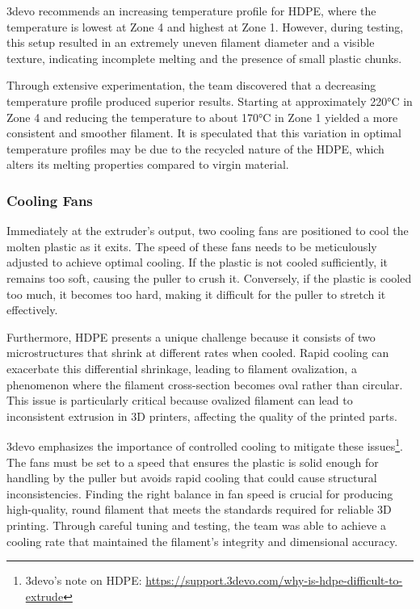 3devo recommends an increasing temperature profile for HDPE, where the temperature is lowest at 
Zone 4 and highest at Zone 1. However, during testing, this setup resulted in an extremely uneven 
filament diameter and a visible texture, indicating incomplete melting and the presence of small 
plastic chunks.

Through extensive experimentation, the team discovered that a decreasing temperature profile 
produced superior results. Starting at approximately 220°C in Zone 4 and reducing the temperature 
to about 170°C in Zone 1 yielded a more consistent and smoother filament. It is speculated that 
this variation in optimal temperature profiles may be due to the recycled nature of the HDPE, 
which alters its melting properties compared to virgin material.

\subsubsection*{Cooling Fans}
Immediately at the extruder's output, two cooling fans are positioned to cool the molten plastic 
as it exits. The speed of these fans needs to be meticulously adjusted to achieve optimal cooling. 
If the plastic is not cooled sufficiently, it remains too soft, causing the puller to crush it. 
Conversely, if the plastic is cooled too much, it becomes too hard, making it difficult for the 
puller to stretch it effectively.

Furthermore, HDPE presents a unique challenge because it consists of two microstructures that 
shrink at different rates when cooled. Rapid cooling can exacerbate this differential shrinkage, 
leading to filament ovalization, a phenomenon where the filament cross-section becomes oval rather 
than circular. This issue is particularly critical because ovalized filament can lead to 
inconsistent extrusion in 3D printers, affecting the quality of the printed parts.

3devo emphasizes the importance of controlled cooling to mitigate these issues\footnote{3devo's 
note on HDPE: \url{https://support.3devo.com/why-is-hdpe-difficult-to-extrude}}. The fans must be 
set to a speed that ensures the plastic is solid enough for handling by the puller but avoids 
rapid cooling that could cause structural inconsistencies. Finding the right balance in fan speed 
is crucial for producing high-quality, round filament that meets the standards required for 
reliable 3D printing. Through careful tuning and testing, the team was able to achieve a cooling 
rate that maintained the filament's integrity and dimensional accuracy.

